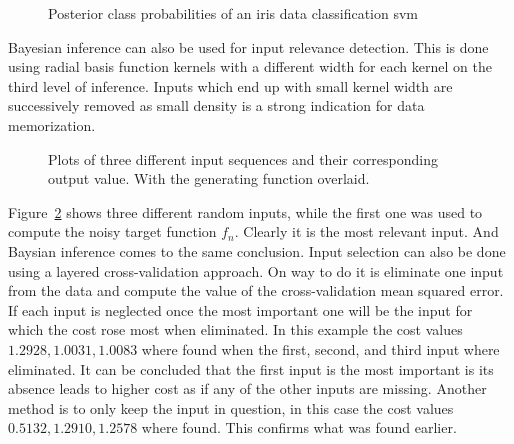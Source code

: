 \begin{figure}
\centering

\caption{Posterior class probabilities of an iris data classification svm}
\label{fig:bayesianClass}
\end{figure}
Bayesian inference can also be used for input relevance detection. This is done using radial basis function kernels with a different width for each kernel on the third level of inference. Inputs which end up with small kernel width are successively removed as small density is a strong indication for data memorization. 
\begin{figure}
\centering



\caption{Plots of three different input sequences and their corresponding output value. With the generating function overlaid.}
\label{fig:AIDBayes}
\end{figure}
Figure~\ref{fig:AIDBayes} shows three different random inputs, while the first one was used to compute the noisy target function $f_n$. Clearly it is the most relevant input. And Baysian inference comes to the same conclusion.
Input selection can also be done using a layered cross-validation approach. On way to do it is eliminate one input from the data and compute the value of the cross-validation mean squared error. If each input is neglected once the most important one will be the input for which the cost rose most when eliminated. In this example the cost values $1.2928, 1.0031,  1.0083$ where found when the first, second, and third input where eliminated. It can be concluded that the first input is the most important is its absence leads to higher cost as if any of the other inputs are missing. Another method is to only keep the input in question, in this case the cost values $0.5132, 1.2910, 1.2578$ where found. This confirms what was found earlier. 

